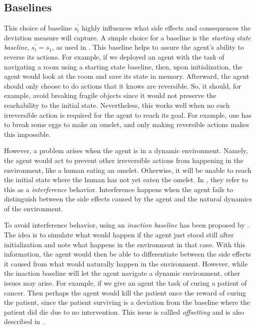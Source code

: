 \documentclass[12pt,A4]{report}
\theoremstyle{definition}
\begin{document}
\subsection{Baselines}
This choice of baseline $s^\prime_t$ highly influences what side effects and consequences the deviation measure will capture. A simple choice for a baseline is the \textit{starting state baseline}, $s^{\prime}_t = s_1$, as used in \citet{Eysenbach}. This baseline helps to assure the agent's ability to reverse its actions. For example, if we deployed an agent with the task of navigating a room using a starting state baseline, then, upon initialization, the agent would look at the room and save its state in memory. Afterward, the agent should only choose to do actions that it knows are reversible. So, it should, for example, avoid breaking fragile objects since it would not preserve the reachability to the initial state. Nevertheless, this works well when no such irreversible action is required for the agent to reach its goal. For example, one has to break some eggs to make an omelet, and only making reversible actions makes this impossible. 

However, a problem arises when the agent is in a dynamic environment. Namely, the agent would act to prevent other irreversible actions from happening in the environment, like a human eating an omelet. Otherwise, it will be unable to reach the initial state where the human has not yet eaten the omelet. In \citet{Krakovna19}, they refer to this as a \textit{interference} behavior. Interference happens when the agent fails to distinguish between the side effects caused by the agent and the natural dynamics of the environment. 

To avoid interference behavior, using an \textit{inaction baseline} has been proposed by \citet{Krakovna19}. The idea is to simulate what would happen if the agent just stood still after initialization and note what happens in the environment in that case. With this information, the agent would then be able to differentiate between the side effects it caused from what would naturally happen in the environment. However, while the inaction baseline will let the agent navigate a dynamic environment, other issues may arise. For example, if we give an agent the task of curing a patient of cancer. Then perhaps the agent would kill the patient once the reward of curing the patient, since the patient surviving is a deviation from the baseline where the patient did die due to no intervention. This issue is callled \textit{offsetting} and is also described in \citet{Krakovna19}.
\end{document}
